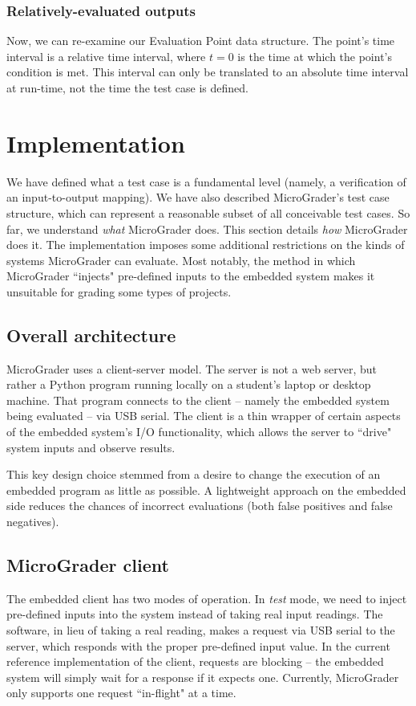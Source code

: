 \documentclass[12pt]{article}
\begin{document}
\subsubsection{Relatively-evaluated outputs}
Now, we can re-examine our Evaluation Point data structure.  The point's time interval is a relative time interval, where $t=0$ is the time at which the point's condition is met.  This interval can only be translated to an absolute time interval at run-time, not the time the test case is defined.

\newpage
\section{Implementation}
We have defined what a test case is a fundamental level (namely, a verification of an input-to-output mapping).  We have also described MicroGrader's test case structure, which can represent a reasonable subset of all conceivable test cases.  So far, we understand \textit{what} MicroGrader does.  This section details \textit{how} MicroGrader does it.  The implementation imposes some additional restrictions on the kinds of systems MicroGrader can evaluate.  Most notably, the method in which MicroGrader ``injects" pre-defined inputs to the embedded system makes it unsuitable for grading some types of projects.

\subsection{Overall architecture}
\label{sec:architecture}
MicroGrader uses a client-server model.  The server is not a web server, but rather a Python program running locally on a student's laptop or desktop machine.  That program connects to the client -- namely the embedded system being evaluated -- via USB serial.  The client is a thin wrapper of certain aspects of the embedded system's I/O functionality, which allows the server to ``drive" system inputs and observe results.

This key design choice stemmed from a desire to change the execution of an embedded program as little as possible.  A lightweight approach on the embedded side reduces the chances of incorrect evaluations (both false positives and false negatives).

\subsection{MicroGrader client}
The embedded client has two modes of operation.  In \textit{test} mode, we need to inject pre-defined inputs into the system instead of taking real input readings.  The software, in lieu of taking a real reading, makes a request via USB serial to the server, which responds with the proper pre-defined input value.  In the current reference implementation of the client, requests are blocking -- the embedded system will simply wait for a response if it expects one.  Currently, MicroGrader only supports one request ``in-flight" at a time.
\end{document}
